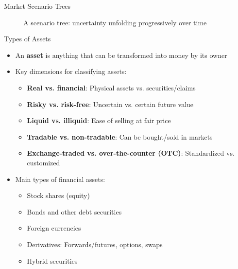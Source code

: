 \documentclass[10pt,handout]{beamer}
\begin{document}
\begin{frame}{Market Scenario Trees}
\begin{figure}
  \caption{A scenario tree: uncertainty unfolding progressively over time}
\end{figure}
\end{frame}


\begin{frame}{Types of Assets}
  \begin{itemize}[<+->]
    \item An \textbf{asset} is anything that can be transformed into money by its owner
    \item Key dimensions for classifying assets:
      \begin{itemize}
        \item \textbf{Real vs. financial}: Physical assets vs. securities/claims
        \item \textbf{Risky vs. risk-free}: Uncertain vs. certain future value
        \item \textbf{Liquid vs. illiquid}: Ease of selling at fair price
        \item \textbf{Tradable vs. non-tradable}: Can be bought/sold in markets
        \item \textbf{Exchange-traded vs. over-the-counter (OTC)}: Standardized vs. customized
      \end{itemize}
    \item Main types of financial assets:
      \begin{itemize}
        \item Stock shares (equity)
        \item Bonds and other debt securities
        \item Foreign currencies
        \item Derivatives: Forwards/futures, options, swaps
        \item Hybrid securities
      \end{itemize}
  \end{itemize}
\end{frame}
\end{document}
